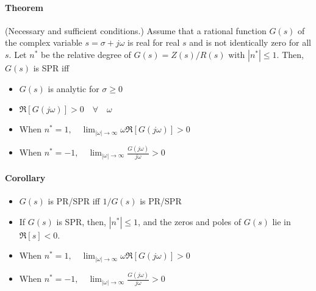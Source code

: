 \paragraph{Theorem} (Necessary and sufficient conditions.) Assume that a rational function $G(s)$ of the complex variable $s = \sigma + j\omega$ is real for real $s$ and is not identically zero for all $s$. Let $n^*$ be the relative degree of $G(s) = Z(s) / R(s) \mbox{ with } |n^*| \leq 1$. Then, $G(s)$ is SPR iff
\begin{itemize}
	\item $G(s)$ is analytic for $\sigma \geq 0$
	\item $\Re[G(j\omega)] > 0 \quad \forall \quad \omega$
	\item When $n^* = 1, \quad \lim_{|\omega| \to \infty} \omega \Re[G(j\omega)] > 0 $
	\item When $n^* = -1,\quad \lim_{|\omega| \to \infty} \frac{G(j\omega)}{j\omega} >0 $
\end{itemize}

\paragraph{Corollary}
\begin{itemize}
	\item $G(s)$ is PR/SPR iff $1/G(s)$ is PR/SPR
	\item If $G(s)$ is SPR, then, $|n^*| \leq 1$, and the zeros and poles of $G(s)$ lie in $\Re[s]<0$.
	\item When $n^* = 1, \quad \lim_{|\omega| \to \infty} \omega \Re[G(j\omega)] > 0 $
	\item When $n^* = -1,\quad \lim_{|\omega| \to \infty} \frac{G(j\omega)}{j\omega} >0 $
\end{itemize}

